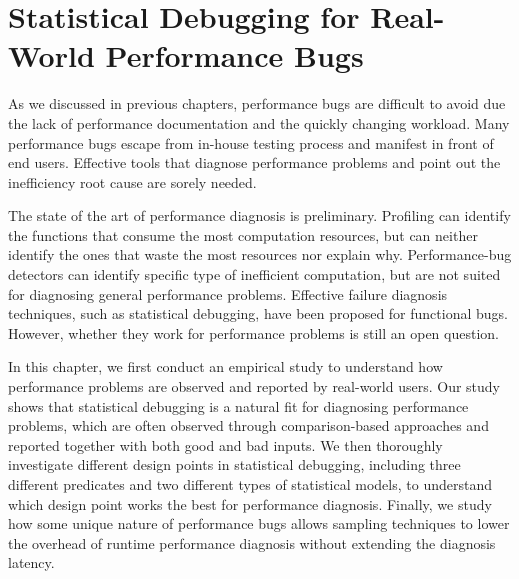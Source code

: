 \chapter[Statistical Debugging for Real-World Performance Bugs]{Statistical Debugging for Real-World Performance Bugs}
\label{chap:sd}

As we discussed in previous chapters, performance bugs are difficult to 
avoid due the lack of performance documentation and the quickly changing workload. 
Many performance bugs escape from in-house testing process and manifest in front of end users. 
Effective tools that diagnose performance problems and point out the inefficiency root cause 
are sorely needed.

The state of the art of performance diagnosis is preliminary. Profiling
can identify the functions that consume the most computation resources, 
but can neither identify the ones that waste the most resources nor explain why.
Performance-bug detectors can identify
specific type of inefficient computation, but are not suited for
diagnosing general performance problems. Effective failure
diagnosis techniques, such as statistical debugging, have been proposed for
functional bugs. However, whether they work for
performance problems is still an open question.

In this chapter, we first conduct an empirical study to understand how performance
problems are observed and reported by real-world users. Our study shows that
statistical debugging is a natural fit for diagnosing 
performance problems, which
are often observed through comparison-based approaches and
reported together with both good and bad inputs. We then thoroughly investigate
different design points in statistical debugging, including three different
predicates and two different types of statistical models, to understand which
design point works the best for performance diagnosis. Finally, we study how 
some unique nature of performance bugs allows sampling techniques to  
lower the overhead of runtime performance diagnosis without extending the
diagnosis latency.






